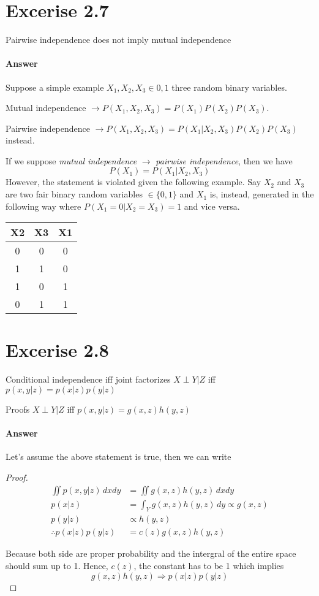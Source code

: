 \documentclass[12pt, letterpaper]{article}
\begin{document}
\section{Excerise 2.7}
Pairwise independence does not imply mutual independence

\paragraph{Answer}
Suppose a simple example $X_1, X_2, X_3 \in {0, 1}$ three random binary variables.

Mutual independence $\rightarrow P(X_1, X_2, X_3) = P(X_1) P(X_2) P(X_3)$.

Pairwise independence $\rightarrow P(X_1, X_2, X_3) = P(X_1|X_2, X_3) P(X_2) P(X_3)$ instead.

If we suppose \textit{mutual independence} $\rightarrow$ \textit{pairwise independence}, then we have
\[
    P(X_1) = P(X_1 | X_2, X_3)
\]
However, the statement is violated given the following example.
Say $X_2$ and $X_3$ are two fair binary random variables $\in \{0, 1\}$ and $X_1$ is, instead,
generated in the following way where $P(X_1 = 0 | X_2 = X_3) = 1$ and vice versa. 
\begin{center}
\begin{tabular}{|c c c|} 
    \hline
    X2 & X3 & X1 \\ [0.5ex] 
    \hline\hline
    0 & 0 & 0 \\ 
    \hline
    1 & 1 & 0 \\
    \hline
    1 & 0 & 1 \\
    \hline
    0 & 1 & 1 \\
    \hline
\end{tabular}
\end{center}

\section{Excerise 2.8}
Conditional independence iff joint factorizes $X \perp Y |Z$ iff $p(x, y|z) = p(x|z)p(y|z)$

Proofs $X \perp Y |Z$ iff $p(x, y|z) = g(x, z)h(y, z)$

\paragraph{Answer}
Let's assume the above statement is true, then we can write
\begin{proof}
\begin{align*}
    \iint p(x, y|z) \, dxdy &= \iint g(x, z)h(y, z) \, dxdy \\
    p(x|z) &= \int_Y g(x, z)h(y, z) \, dy \propto g(x, z) \\
    p(y|z) &\propto h(y, z) \\
    \therefore p(x|z)p(y|z) &= c(z)g(x, z)h(y, z)
\end{align*}

Because both side are proper probability and the intergral of the entire space should sum up to 1.
Hence, $c(z)$, the constant has to be 1 which implies
\[
    g(x, z)h(y, z) \Rightarrow p(x|z)p(y|z)
\]
\end{proof}
\end{document}
